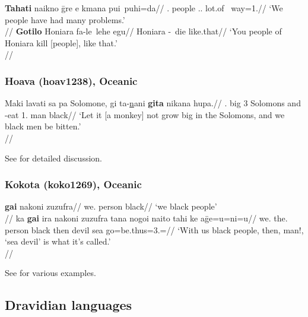 \documentclass[A4paper]{article}
\begin{document}
\pex 
\a \begingl
\gla \textbf{Tahati} naikno \={g}re e kmana pui~puhi=da//
\Pl.\Incl{} people \Dem.\Prox.\Pl{} \Emph{} lot.of \Dur~way=1\Pl.\Poss{}//
\glft `We people have had many problems.'\\\citep[165, (591)]{boswell2018}//
\endgl
\a \begingl
\gla \textbf{Gotilo} Honiara fa-le~lehe egu//
\Pl{} Honiara \Caus-\Dur~die like.that//
\glft `You people of Honiara kill [people], like that.'\\\citep[99, (301)]{boswell2018}//
\endgl
\xe


\subsubsection{Hoava (hoav1238), Oceanic}


\ex \begingl
\gla Maki lavati sa pa Solomone, gi ta-\underline{n}ani \textbf{gita} nikana hupa.//
\glb \Neg{}.\Imp{} big 3\Sg{} \Loc{} Solomons and \Pass-eat 1\Pl.\Incl{} man black//
\glft `Let it [a monkey] not grow big in the Solomons, and we black men be bitten.'\\\citep[after][48, (72a)]{davis2003}//
\endgl
\xe

See \citealp{palmer2017} for detailed discussion.

\subsubsection{Kokota (koko1269), Oceanic}

\pex
\a 
\begingl
\gla \textbf{gai} nakoni zuzufra//
\glb we.\Excl{} person black//
\glft `we black people'\\\citep[95, (3.70a)]{palmer2008}//
\endgl
\a 
\begingl
\gla ka \textbf{gai} ira nakoni zuzufra tana nogoi naito tahi ke a\={g}e=u=ni=u//
\glb \Loc{} we.\Incl{} the.\Pl{} person black then \Voc{} devil sea \Pfv{} go=be.thus=3\Sg.\Obj=\Cnt//
\glft `With us black people, then, man!, `sea devil' is what it's called.' \\\citep[123, (4.1b)]{palmer2008}//
\endgl
\xe

See \citet[68, 95, 116, 119, 123, 131, 137, 163, 242, 300, 305, 327, 399, 414]{palmer2008} for various examples.

\subsection{Dravidian languages}
\end{document}
